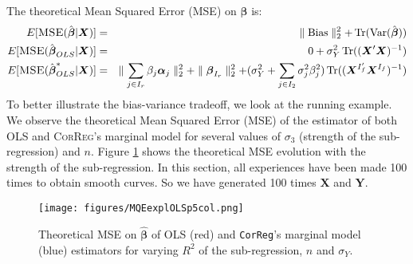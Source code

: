 \documentclass[12pt,a4paper]{report}
\begin{document}
		  
	 The theoretical Mean Squared Error (\textsc{MSE}) on $\hat{\boldsymbol{\beta}}$ is:
	\begin{eqnarray}
		E[\textsc{MSE}(\hat{\boldsymbol{\beta}}|\boldsymbol{X})]&=&\parallel \operatorname{Bias}\parallel_2^2+\operatorname{Tr}(\operatorname{Var}(\hat{\boldsymbol{\beta}})) \\
			E[\textsc{MSE}(\hat{\boldsymbol{\beta}}_{OLS}|\boldsymbol{X})]&=& 0 + \sigma_Y^2 \operatorname{Tr}((\boldsymbol{X}'\boldsymbol{X})^{-1}) %
			 \\
			E[\textsc{MSE}(\hat{\boldsymbol{\beta}}^*_{OLS}|\boldsymbol{X})]&=& \parallel\sum_{j \in I_r}\beta_{j}\boldsymbol{\alpha}_j \parallel_2^2 +\parallel \boldsymbol{\beta}_{I_r}\parallel^2_2 + (\sigma^2_Y+\sum_{j \in I_2}\sigma^2_{j}\beta_{j}^2 ) \operatorname{Tr}((\boldsymbol{X}^{I_f'} \boldsymbol{X}^{I_f})^{-1})
	\end{eqnarray}	 
	To better illustrate the bias-variance tradeoff, we look at the running example. We observe the theoretical Mean Squared Error (MSE) of the estimator of both OLS and \textsc{CorReg}'s marginal  model for several values of $\sigma_3$ (strength of the sub-regression) and $n$. Figure \ref{MQEexplOLSp5col} shows the theoretical MSE evolution with the strength of the sub-regression. In this section, all experiences have been made 100 times to obtain smooth curves. So we have generated 100 times $\boldsymbol{X}$ and $\boldsymbol{Y}$.
\begin{figure}[h!]
	\texttt{[image: figures/MQEexplOLSp5col.png]}\label{MQEexplOLSp5col}
	\caption{Theoretical MSE on $\hat{\boldsymbol{\beta}}$ of OLS (red) and {\tt CorReg}'s marginal model (blue) estimators for varying $R^2$ of the sub-regression, $n$ and $\sigma_Y$.}
\end{figure} 
\end{document}
